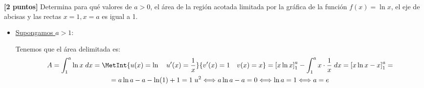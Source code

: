 \documentclass[12pt]{article}
\begin{document}
\begin{ejercicio}\textbf{[2 puntos]}
    Determina para qué valores de $a>0$, el área de la región acotada limitada por la gráfica de la función $f(x)=\ln x$, el eje de abcisas y las rectas $x=1, x=a$ es igual a 1.
    
    \begin{figure}[H]
        \centering
        
    \end{figure}
    
    \begin{itemize}
        \item \underline{Supongamos $a>1$}:
        
        Tenemos que el área delimitada es:
        \begin{multline*}
            A=\int_1^a \ln x\;dx = \MetInt{u(x)=\ln \quad u'(x)=\frac{1}{x}}{v'(x)=1 \quad v(x)=x} = \left[x\ln x\right]_1^a -\int_1^a x\cdot \frac{1}{x}\;dx = \left[x\ln x -x\right]_1^a
            =\\= a\ln a -a -\ln(1)+1 = 1\;u^2 \Longleftrightarrow a\ln a -a = 0 \Longleftrightarrow \ln a =1 \Longleftrightarrow a=e
        \end{multline*}
    

\end{itemize}
\end{ejercicio}
\end{document}
